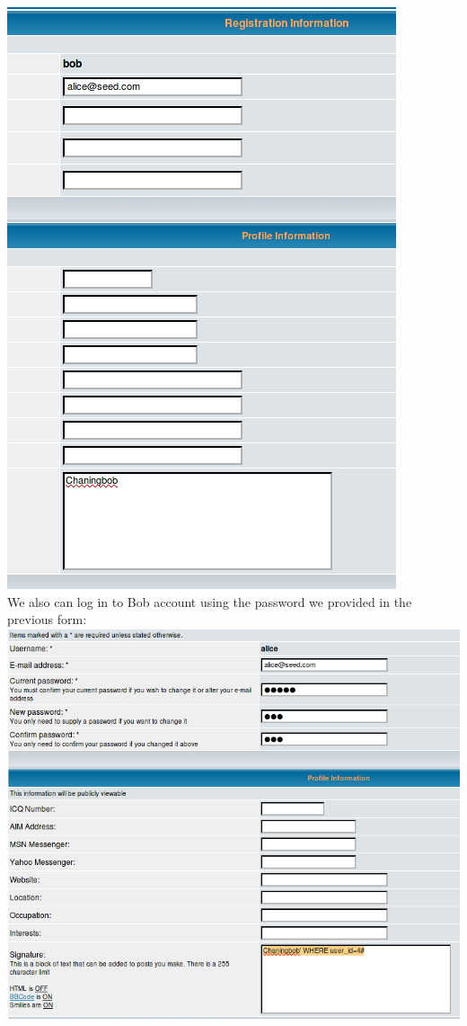 \documentclass[12pt, a4paper, pdflatex]{article}
\begin{document}
\includegraphics[width=.95\textwidth]{gfx/sql/changed_bob.png}\\
We also can log in to Bob account using the password we provided in the previous form:\\
\includegraphics[width=.95\textwidth]{gfx/sql/chainging_alice.png}\\
\end{document}
